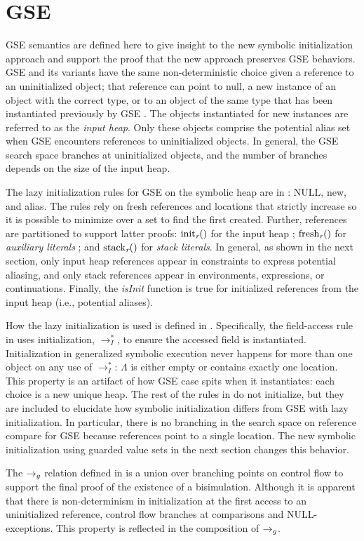 \section{GSE}
\label{app:gse}
GSE semantics are defined here to give insight to the new symbolic initialization approach and support the proof that the new approach preserves GSE behaviors. GSE and its variants have the same non-deterministic choice given a reference to an uninitialized object; that reference can point to null, a new instance of an object with the correct type, or to an object of the same type that has been instantiated previously by GSE \cite{GSE03,KiasanKunit,Cadar:2008,Rosner:2015}. The objects instantiated for new instances are referred to as the \emph{input heap}. Only these objects comprise the potential alias set when GSE encounters references to uninitialized objects. In general, the GSE search space branches at uninitialized objects, and the number of branches depends on the size of the input heap.

The lazy initialization rules for GSE on the symbolic heap are in
: NULL, new, and alias. The rules rely on fresh references and locations that strictly increase so it is possible to minimize over a set to find the first created. Further, references are partitioned to support latter proofs: $\mathrm{init}_{\emph{r}}()$ for the input
  heap
  ; $\mathrm{fresh}_{\emph{r}}()$ for \emph{auxiliary
  literals}
  ; and $\mathrm{stack}_{\emph{r}}()$ for \emph{stack
    literals}.
  In general, as shown in the next section,
  only input heap references appear in constraints to express potential aliasing, and only stack references appear in environments, expressions, or continuations.  Finally, the \emph{isInit} function is true for initialized references from the input heap (i.e., potential aliases). 

How the lazy
initialization is used is defined in . Specifically,
the field-access rule in  uses initialization,
$\rightarrow_I^*$, to ensure the accessed field is
instantiated. Initialization in generalized symbolic execution never
happens for more than one object on any use of $\rightarrow_I^*$:
$\Lambda$ is either empty or contains exactly one location. This property is an artifact of how GSE case spits when it instantiates: each choice is a new unique heap. The rest of the rules in  do not initialize, but they are included to elucidate how symbolic initialization differs from GSE with lazy initialization. In particular, there is no branching in the search space on reference compare for GSE because references point to a single location. The new symbolic initialization using guarded value sets in the next section changes this behavior. 


The $\rightarrow_{g}$ relation defined in  is a union over branching points on control flow
to support the final proof of the existence of a
bisimulation. Although it is apparent that there is non-determinism in
initialization at the first access to an uninitialized reference, control flow branches at comparisons and NULL-exceptions. This property is reflected in the composition of $\rightarrow_{g}$.



